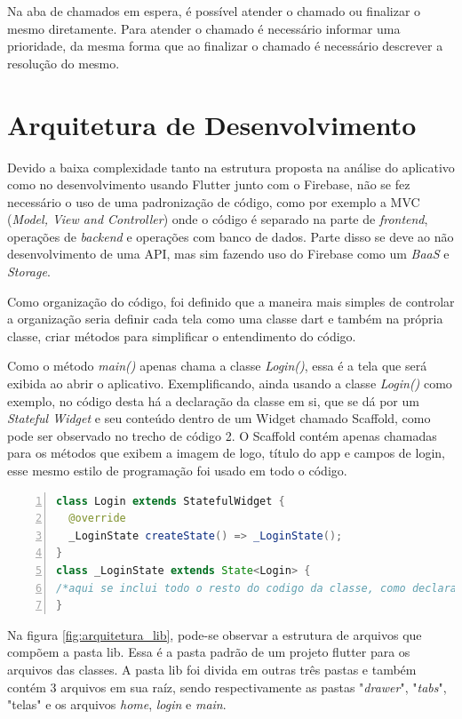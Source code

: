  Na aba de chamados em espera, é possível atender o chamado ou finalizar o mesmo diretamente. Para atender o chamado é necessário informar uma prioridade, da mesma forma que ao finalizar o chamado é necessário descrever a resolução do mesmo.
\newpage

\section{Arquitetura de Desenvolvimento}
Devido a baixa complexidade tanto na estrutura proposta na análise do aplicativo como no desenvolvimento usando Flutter junto com o Firebase, não se fez necessário o uso de uma padronização de código, como por exemplo a MVC (\textit{Model, View and Controller}) onde o código é separado na parte de \textit{frontend}, operações de \textit{backend} e operações com banco de dados. Parte disso se deve ao não desenvolvimento de uma API, mas sim fazendo uso do Firebase como um \textit{BaaS} e \textit{Storage}.

Como organização do código, foi definido que a maneira mais simples de controlar a organização seria definir cada tela como uma classe dart e também na própria classe, criar métodos para simplificar o entendimento do código.

Como o método \textit{main()} apenas chama a classe \textit{Login()}, essa é a tela que será exibida ao abrir o aplicativo. Exemplificando, ainda usando a classe \textit{Login()} como exemplo, no código desta há a declaração da classe em si, que se dá por um \textit{Stateful Widget} e seu conteúdo dentro de um Widget chamado Scaffold, como pode ser observado no trecho de código 2. O Scaffold contém apenas chamadas para os métodos que exibem a imagem de logo, título do app e campos de login, esse mesmo estilo de programação foi usado em todo o código.
\begin{lstlisting}[numbers=left, language=Java, style=mycode, caption={Trecho de Código página de Login}, label={lst:loginpage-code}]
class Login extends StatefulWidget {
  @override
  _LoginState createState() => _LoginState();
}
class _LoginState extends State<Login> {
/*aqui se inclui todo o resto do codigo da classe, como declaracao de variaveis, metodos e os Widgets*/ 
}
\end{lstlisting}
\justifying\setlength{\parindent}{1,25cm} 

\newpage
Na figura \ref{fig:arquitetura_lib}, pode-se observar a estrutura de arquivos que compõem a pasta lib. Essa é a pasta padrão de um projeto flutter para os arquivos das classes. A pasta lib foi divida em outras três pastas e também contém 3 arquivos em sua raíz, sendo respectivamente as pastas "\textit{drawer}", "\textit{tabs}", "telas" e os arquivos \textit{home}, \textit{login} e \textit{main}.

